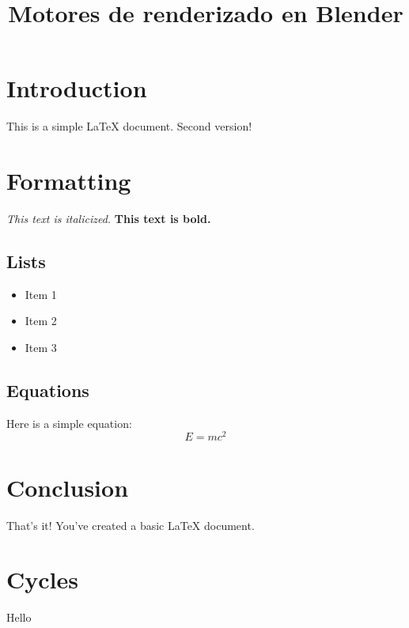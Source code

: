 \documentclass{article}
\title{Motores de renderizado en Blender}
\begin{document}
\maketitle

\section{Introduction}
This is a simple LaTeX document. Second version!

\section{Formatting}
\textit{This text is italicized.}
\textbf{This text is bold.}

\subsection{Lists}
\begin{itemize}
  \item Item 1
  \item Item 2
  \item Item 3
\end{itemize}

\subsection{Equations}
Here is a simple equation:
\[E=mc^2\]

\section{Conclusion}
That's it! You've created a basic LaTeX document.

\section{Cycles}
Hello
\end{document}
